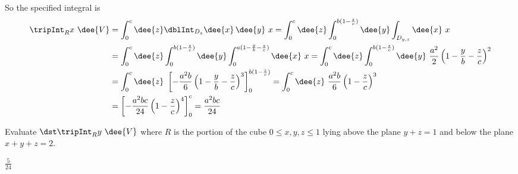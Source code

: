 \begin{solution}
So the specified integral is
\begin{align*}
\tripInt_R x\ \dee{V}
&=\int_0^c \dee{z} \dblInt_{D_z} \dee{x}\,\dee{y}\ x
 = \int_0^c \dee{z}\int_0^{b(1-{z\over c})}\dee{y}\int_{D_{y,z}}\dee{x}\ x\\
&=\int_0^c \dee{z}\int_0^{b(1-{z\over c})}\dee{y}
             \int_0^{a(1-{y\over b}-{z\over c})} \dee{x}\ x
=\int_0^c \dee{z}\int_0^{b(1-{z\over c})} \dee{y}\ \frac{a^2}{2}
\left(1-\frac{y}{b}-\frac{z}{c}\right)^2 \\
&=\int_0^c \dee{z}\ \left[-\frac{a^2b}{6}
           \left(1-\frac{y}{b}-\frac{z}{c}\right)^3
                                    \right]_0^{b(1-{z\over c})}
=\int_0^c \dee{z}\ \frac{a^2b}{6}\left(1-\frac{z}{c}\right)^3 \\
&=\left[-\frac{a^2bc}{24}\left(1-\frac{z}{c}\right)^4  \right]_0^c
=\frac{a^2bc}{24}
\end{align*}
\end{solution}

\begin{question}
Evaluate $\dst\tripInt_R y\ \dee{V}$ where $R$ is the portion
of the cube $0\le x,y,z\le 1$ lying above the plane $y+z=1$ and below the 
plane $x+y+z=2$.
\end{question}

%

\begin{answer}
$\frac{5}{24}$
\end{answer}

